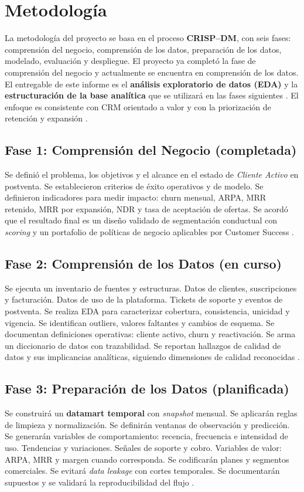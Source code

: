 \section{Metodología}

La metodología del proyecto se basa en el proceso \textbf{CRISP–DM}, con seis fases: comprensión del negocio, comprensión de los datos, preparación de los datos, modelado, evaluación y despliegue. El proyecto ya completó la fase de comprensión del negocio y actualmente se encuentra en comprensión de los datos. El entregable de este informe es el \textbf{análisis exploratorio de datos (EDA)} y la \textbf{estructuración de la base analítica} que se utilizará en las fases siguientes \citep{Chapman2000}. El enfoque es consistente con CRM orientado a valor y con la priorización de retención y expansión \citep{Kumar2018}.

\subsection{Fase 1: Comprensión del Negocio (completada)}
Se definió el problema, los objetivos y el alcance en el estado de \textit{Cliente Activo} en postventa. Se establecieron criterios de éxito operativos y de modelo. Se definieron indicadores para medir impacto: churn mensual, ARPA, MRR retenido, MRR por expansión, NDR y tasa de aceptación de ofertas. Se acordó que el resultado final es un diseño validado de segmentación conductual con \textit{scoring} y un portafolio de políticas de negocio aplicables por Customer Success \citep{Chapman2000,Kumar2018}.

\subsection{Fase 2: Comprensión de los Datos (en curso)}
Se ejecuta un inventario de fuentes y estructuras. Datos de clientes, suscripciones y facturación. Datos de uso de la plataforma. Tickets de soporte y eventos de postventa. Se realiza EDA para caracterizar cobertura, consistencia, unicidad y vigencia. Se identifican outliers, valores faltantes y cambios de esquema. Se documentan definiciones operativas: cliente activo, churn y reactivación. Se arma un diccionario de datos con trazabilidad. Se reportan hallazgos de calidad de datos y sus implicancias analíticas, siguiendo dimensiones de calidad reconocidas \citep{DAMA2013,Chapman2000}.

\subsection{Fase 3: Preparación de los Datos (planificada)}
Se construirá un \textbf{datamart temporal} con \textit{snapshot} mensual. Se aplicarán reglas de limpieza y normalización. Se definirán ventanas de observación y predicción. Se generarán variables de comportamiento: recencia, frecuencia e intensidad de uso. Tendencias y variaciones. Señales de soporte y cobro. Variables de valor: ARPA, MRR y margen cuando corresponda. Se codificarán planes y segmentos comerciales. Se evitará \textit{data leakage} con cortes temporales. Se documentarán supuestos y se validará la reproducibilidad del flujo \citep{Chapman2000}.

